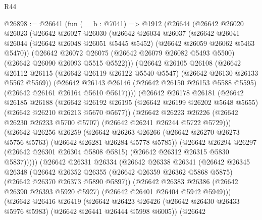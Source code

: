 \begin{lexlean}{R44}
\begin{coremodule}
{@26898 := @26641
    (fun (__b : @7041) =>
    @1912
      (@26644
        (@26642
          @26020
          @26023
          (@26642
            @26027
            @26030
            (@26642
              @26034
              @26037
              (@26642
                @26041
                @26044
                (@26642 @26048 @26051 @5445 @5452)
                (@26642 @26059 @26062 @5463 @5470))
              (@26642
                @26072
                @26075
                (@26642 @26079 @26082 @5493 @5500)
                (@26642 @26090 @26093 @5515 @5522)))
            (@26642
              @26105
              @26108
              (@26642
                @26112
                @26115
                (@26642 @26119 @26122 @5540 @5547)
                (@26642 @26130 @26133 @5562 @5569))
              (@26642
                @26143
                @26146
                (@26642 @26150 @26153 @5588 @5595)
                (@26642 @26161 @26164 @5610 @5617))))
          (@26642
            @26178
            @26181
            (@26642
              @26185
              @26188
              (@26642
                @26192
                @26195
                (@26642 @26199 @26202 @5648 @5655)
                (@26642 @26210 @26213 @5670 @5677))
              (@26642
                @26223
                @26226
                (@26642 @26230 @26233 @5700 @5707)
                (@26642 @26241 @26244 @5722 @5729)))
            (@26642
              @26256
              @26259
              (@26642
                @26263
                @26266
                (@26642 @26270 @26273 @5756 @5763)
                (@26642 @26281 @26284 @5778 @5785))
              (@26642
                @26294
                @26297
                (@26642 @26301 @26304 @5808 @5815)
                (@26642 @26312 @26315 @5830 @5837)))))
        (@26642
          @26331
          @26334
          (@26642
            @26338
            @26341
            (@26642
              @26345
              @26348
              (@26642
                @26352
                @26355
                (@26642 @26359 @26362 @5868 @5875)
                (@26642 @26370 @26373 @5890 @5897))
              (@26642
                @26383
                @26386
                (@26642 @26390 @26393 @5920 @5927)
                (@26642 @26401 @26404 @5942 @5949)))
            (@26642
              @26416
              @26419
              (@26642
                @26423
                @26426
                (@26642 @26430 @26433 @5976 @5983)
                (@26642 @26441 @26444 @5998 @6005))
              (@26642
}
\end{coremodule}
\end{lexlean}
